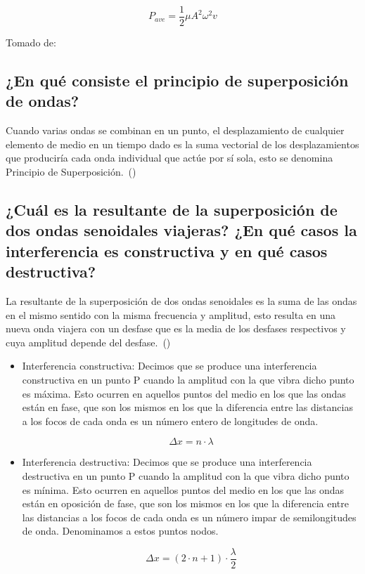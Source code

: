 \documentclass[twocolumn, 12pt]{article}
\begin{document}
\begin{equation*}
    P_{ave} = \frac{1}{2} \mu A^{2} \omega^{2}v
\end{equation*}

Tomado de:~\cite{Moebs_2021b}

\subsection{¿En qué consiste el principio de superposición de ondas?}

Cuando varias ondas se combinan en un punto, el
desplazamiento de cualquier elemento de medio en un tiempo
dado es la suma vectorial de los desplazamientos que
produciría cada onda individual que actúe por sí sola, esto
se denomina Principio de
Superposición.~(\cite{superposicion})

\subsection{¿Cuál es la resultante de la superposición de dos ondas senoidales viajeras? ¿En qué casos la
    interferencia es constructiva y en qué casos destructiva?}

La resultante de la superposición de dos ondas senoidales
es la suma de las ondas en el mismo sentido con la misma
frecuencia y amplitud, esto resulta en una nueva onda
viajera con un desfase que es la media de los desfases
respectivos y cuya amplitud depende del
desfase.~(\cite{Superposicióndeondas})

\begin{itemize}[label=$\triangleright$]
    \item Interferencia constructiva: Decimos que se produce una
          interferencia constructiva en un punto P cuando la amplitud
          con la que vibra dicho punto es máxima. Esto ocurren en
          aquellos puntos del medio en los que las ondas están en
          fase, que son los mismos en los que la diferencia entre las
          distancias a los focos de cada onda es un número entero de
          longitudes de onda.

          \begin{equation*}
              \Delta x = n \cdot \lambda
          \end{equation*}

    \item Interferencia destructiva: Decimos que se produce una
          interferencia destructiva en un punto P cuando la amplitud
          con la que vibra dicho punto es mínima. Esto ocurren en
          aquellos puntos del medio en los que las ondas están en
          oposición de fase, que son los mismos en los que la
          diferencia entre las distancias a los focos de cada onda es
          un número impar de semilongitudes de onda. Denominamos a
          estos puntos nodos.

          \begin{equation*}
              \Delta x = (2 \cdot n + 1) \cdot \frac{\lambda}{2}
          \end{equation*}
\end{itemize}
\end{document}
